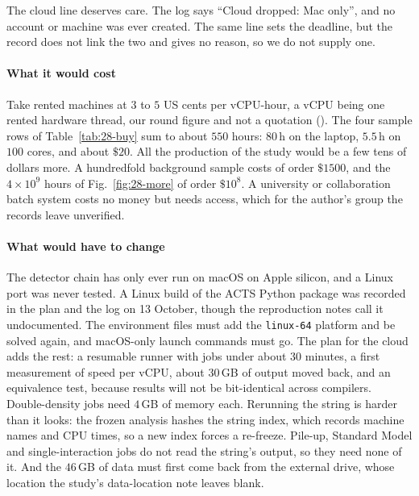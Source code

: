 The cloud line deserves care. The log says ``Cloud dropped: Mac only'', and no account or machine was ever created. The same line sets the deadline, but the record does not link the two and gives no reason, so we do not supply one.

\paragraph{What it would cost}
Take rented machines at $3$ to $5$ US cents per vCPU-hour, a vCPU being one rented hardware thread, our round figure and not a quotation (\EST). The four sample rows of Table~\ref{tab:28-buy} sum to about $550$ hours: $80$\,h on the laptop, $5.5$\,h on $100$ cores, and about $\$20$. All the production of the study would be a few tens of dollars more. A hundredfold background sample costs of order $\$1500$, and the $4\times10^9$ hours of Fig.~\ref{fig:28-more} of order $\$10^8$. A university or collaboration batch system costs no money but needs access, which for the author's group the records leave unverified.

\paragraph{What would have to change}
The detector chain has only ever run on macOS on Apple silicon, and a Linux port was never tested. A Linux build of the ACTS Python package was recorded in the plan and the log on 13 October, though the reproduction notes call it undocumented. The environment files must add the \texttt{linux-64} platform and be solved again, and macOS-only launch commands must go. The plan for the cloud adds the rest: a resumable runner with jobs under about $30$ minutes, a first measurement of speed per vCPU, about $30$\,GB of output moved back, and an equivalence test, because results will not be bit-identical across compilers. Double-density jobs need $4$\,GB of memory each. Rerunning the string is harder than it looks: the frozen analysis hashes the string index, which records machine names and CPU times, so a new index forces a re-freeze. Pile-up, Standard Model and single-interaction jobs do not read the string's output, so they need none of it. And the $46$\,GB of data must first come back from the external drive, whose location the study's data-location note leaves blank.


